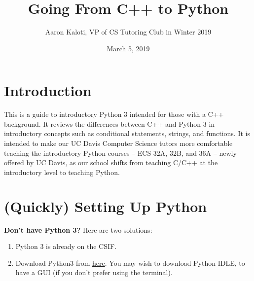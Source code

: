 \documentclass{article}
\title{Going From C++ to Python}
\author{Aaron Kaloti, VP of CS Tutoring Club in Winter 2019}
\date{March 5, 2019}
\begin{document}
\maketitle

\section{Introduction}

This is a guide to introductory Python 3 intended for those with a C++ background. It reviews the differences between C++ and Python 3 in introductory concepts such as conditional statements, strings, and functions. It is intended to make our UC Davis Computer Science tutors more comfortable teaching the introductory Python courses -- ECS 32A, 32B, and 36A -- newly offered by UC Davis, as our school shifts from teaching C/C++ at the introductory level to teaching Python.

\section{(Quickly) Setting Up Python}
\textbf{Don't have Python 3?} Here are two solutions:
\begin{enumerate}
    \item Python 3 is already on the CSIF.
    \item Download Python3 from \href{https://www.python.org/downloads/}{here}. You may wish to download Python IDLE, to have a GUI (if you don't prefer using the terminal). 
\end{enumerate}
\end{document}
